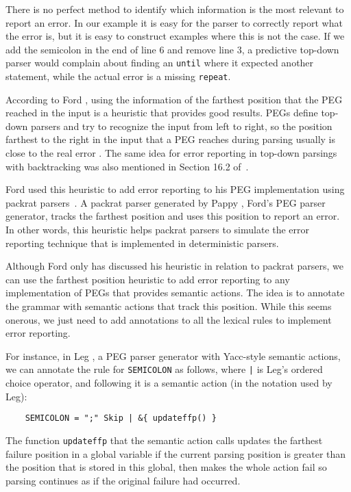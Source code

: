 \documentclass[3p,12pt,singlecolumn]{elsarticle}
\begin{document}
There is no
perfect method to identify which information is the most relevant to
report an error. In our example it is easy for the parser to
correctly report what the error is, but it is easy to construct examples
where this is not the case. If we add the semicolon
in the end of line 6 and remove line 3, a predictive top-down parser
would complain about finding an {\tt until} where it expected 
another statement, while the actual error is a missing {\tt repeat}.

According to Ford \cite{ford2002packrat}, using the information of the farthest position
that the PEG reached in the input is a heuristic that provides
good results.
PEGs define top-down parsers and try to recognize
the input from left to right, so the position farthest to
the right in the input that a PEG reaches during parsing usually is
close to the real error \cite{ford2002packrat}. The same idea
for error reporting in top-down parsings with backtracking was
also mentioned in Section 16.2 of~\cite{grune2010ptp}. 

Ford used this heuristic to add error reporting to his PEG implementation using packrat parsers~\cite{ford2002packrat}.
A packrat parser generated by Pappy \cite{ford2002pappy}, Ford's PEG
parser generator, tracks the farthest position and uses this position
to report an error.
In other words, this heuristic helps packrat parsers to simulate the
error reporting technique that is implemented in deterministic parsers.

Although Ford only has discussed his heuristic in relation to packrat
parsers, we can use the farthest position heuristic to add error reporting
to any implementation of PEGs that provides semantic actions.
The idea is to annotate the grammar with semantic actions that track
this position. While this seems onerous, we just need to add annotations
to all the lexical rules to implement error reporting.

For instance, in Leg \cite{leg}, a PEG parser generator with
Yacc-style semantic actions, we can annotate the rule for \texttt{SEMICOLON} as follows, where {\tt |} is Leg's ordered choice operator, and following it is a semantic action (in the notation used
by Leg): 
\begin{verbatim}
    SEMICOLON = ";" Skip | &{ updateffp() }
\end{verbatim}

The function \texttt{updateffp} that the semantic action calls updates
the farthest failure position in a global variable if the current
parsing position is greater than the position that is stored in
this global, then makes the whole action fail so parsing continues
as if the original failure had occurred.
\end{document}
